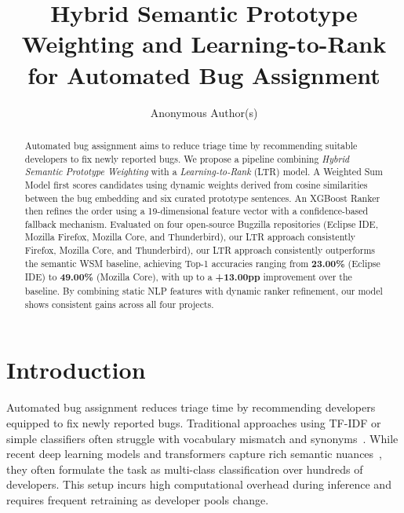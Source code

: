 \documentclass[sigconf,review,anonymous]{acmart}
\begin{document}
\title{Hybrid Semantic Prototype Weighting and Learning-to-Rank for Automated Bug Assignment}

\author{Anonymous Author(s)}

\begin{abstract}
Automated bug assignment aims to reduce triage time by recommending suitable
developers to fix newly reported bugs. We propose a pipeline combining
\emph{Hybrid Semantic Prototype Weighting} with a \emph{Learning-to-Rank}
(LTR) model. A Weighted Sum Model first scores candidates using dynamic
weights derived from cosine similarities between the bug embedding and six
curated prototype sentences. An XGBoost Ranker then refines the order using a
19-dimensional feature vector with a confidence-based fallback mechanism.
Evaluated on four open-source Bugzilla repositories (Eclipse IDE, Mozilla
Firefox, Mozilla Core, and Thunderbird), our LTR approach consistently
Firefox, Mozilla Core, and Thunderbird), our LTR approach consistently
outperforms the semantic WSM baseline, achieving Top-1 accuracies ranging
from \textbf{23.00\%} (Eclipse IDE) to \textbf{49.00\%} (Mozilla Core), with up to a \textbf{+13.00pp} improvement over the baseline. By combining static NLP features with dynamic
ranker refinement, our model shows consistent gains across all four projects.
\end{abstract}


\maketitle

\section{Introduction}

Automated bug assignment reduces triage time by recommending developers equipped to fix newly reported bugs. Traditional approaches using TF-IDF or simple classifiers often struggle with vocabulary mismatch and synonyms~\cite{anvik2006triage}. While recent deep learning models and transformers capture rich semantic nuances~\cite{zaidi2022transformers, dipongkor2023transformer}, they often formulate the task as multi-class classification over hundreds of developers. This setup incurs high computational overhead during inference and requires frequent retraining as developer pools change.
\end{document}
